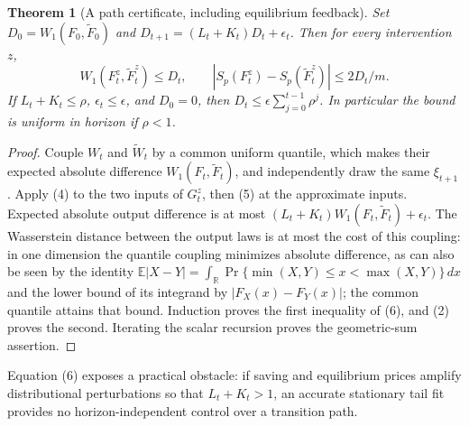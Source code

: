 \documentclass[11pt]{article}
\newtheorem{theorem}{Theorem}
\theoremstyle{remark}
\newcommand{\E}{\mathbb E}
\newcommand{\R}{\mathbb R}
\begin{document}
\begin{theorem}[A path certificate, including equilibrium feedback]
Set $D_0=W_1(F_0,\widetilde F_0)$ and
$D_{t+1}=(L_t+K_t)D_t+\epsilon_t$. Then for every intervention $z$,
\[
 W_1(F_t^z,\widetilde F_t^z)\leq D_t,
 \qquad |S_p(F_t^z)-S_p(\widetilde F_t^z)|\leq2D_t/m. \tag{6}
\]
If $L_t+K_t\leq\rho$, $\epsilon_t\leq\epsilon$, and $D_0=0$, then
$D_t\leq\epsilon\sum_{j=0}^{t-1}\rho^j$. In particular the bound is
uniform in horizon if $\rho<1$.
\end{theorem}
\begin{proof}
Couple $W_t$ and $\widetilde W_t$ by a common uniform quantile, which
makes their expected absolute difference $W_1(F_t,\widetilde F_t)$,
and independently draw the same $\xi_{t+1}$. Apply (4) to the two inputs
of $G_t^z$, then (5) at the approximate inputs. Expected absolute output
difference is at most
$(L_t+K_t)W_1(F_t,\widetilde F_t)+\epsilon_t$.
The Wasserstein distance between the output laws is at most the cost of
this coupling: in one dimension the quantile coupling minimizes absolute
difference, as can also be seen by the identity
$\E|X-Y|=\int_{\R}\Pr\{\min(X,Y)\leq x<\max(X,Y)\}\,dx$
and the lower bound of its integrand by $|F_X(x)-F_Y(x)|$; the common
quantile attains that bound. Induction proves the first inequality of
(6), and (2) proves the second. Iterating the scalar recursion proves
the geometric-sum assertion.
\end{proof}
Equation (6) exposes a practical obstacle: if saving and equilibrium
prices amplify distributional perturbations so that $L_t+K_t>1$, an
accurate stationary tail fit provides no horizon-independent control over
a transition path.
\end{document}
